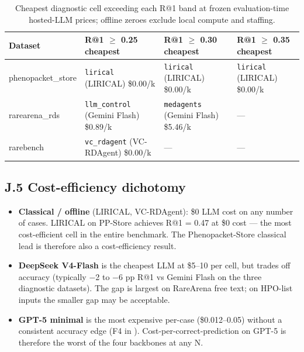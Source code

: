 \begin{table}[t]
\centering\scriptsize\setlength{\tabcolsep}{3.5pt}
\caption{Cheapest diagnostic cell exceeding each R@1 band at frozen evaluation-time hosted-LLM prices; offline zeroes exclude local compute and staffing.}\label{tbl:jcostband}
\begin{tabular}{@{}
>{\raggedright\arraybackslash}p{}
  >{\raggedright\arraybackslash}p{}
  >{\raggedright\arraybackslash}p{}
  >{\raggedright\arraybackslash}p{}@{}}
\toprule
\begin{minipage}[b]{\linewidth}\raggedright
Dataset
\end{minipage} & \begin{minipage}[b]{\linewidth}\raggedright
R@1 \ensuremath{\geq} 0.25 cheapest
\end{minipage} & \begin{minipage}[b]{\linewidth}\raggedright
R@1 \ensuremath{\geq} 0.30 cheapest
\end{minipage} & \begin{minipage}[b]{\linewidth}\raggedright
R@1 \ensuremath{\geq} 0.35 cheapest
\end{minipage} \\
\midrule
phenopacket\_store & \texttt{lirical} (LIRICAL) \$0.00/k & \texttt{lirical} (LIRICAL) \$0.00/k & \texttt{lirical} (LIRICAL) \$0.00/k \\
rarearena\_rds & \texttt{llm\_control} (Gemini Flash) \$0.89/k & \texttt{medagents} (Gemini Flash) \$5.46/k & --- \\
rarebench & \texttt{vc\_rdagent} (VC-RDAgent) \$0.00/k & --- & --- \\
\bottomrule
\end{tabular}
\end{table}

\subsection{J.5 Cost-efficiency dichotomy}\label{j.5-cost-efficiency-dichotomy}

\begin{itemize}
\tightlist
\item
  \textbf{Classical / offline} (LIRICAL, VC-RDAgent): \$0 LLM cost on any number
  of cases. LIRICAL on PP-Store achieves R@1 = 0.47 at \$0 cost --- the most
  cost-efficient cell in the entire benchmark. The Phenopacket-Store
  classical lead is therefore also a cost-efficiency result.
\item
  \textbf{DeepSeek V4-Flash} is the cheapest LLM at \$5--10 per cell, but trades
  off accuracy (typically \ensuremath{-}2 to \ensuremath{-}6 pp R@1 vs Gemini Flash on the three
  diagnostic datasets). The gap is largest on RareArena free text; on
  HPO-list inputs the smaller gap may be acceptable.
\item
  \textbf{GPT-5 minimal} is the most expensive per-case (\$0.012--0.05) without a
  consistent accuracy edge (F4 in ). Cost-per-correct-prediction on GPT-5
  is therefore the worst of the four backbones at any N.
\end{itemize}

